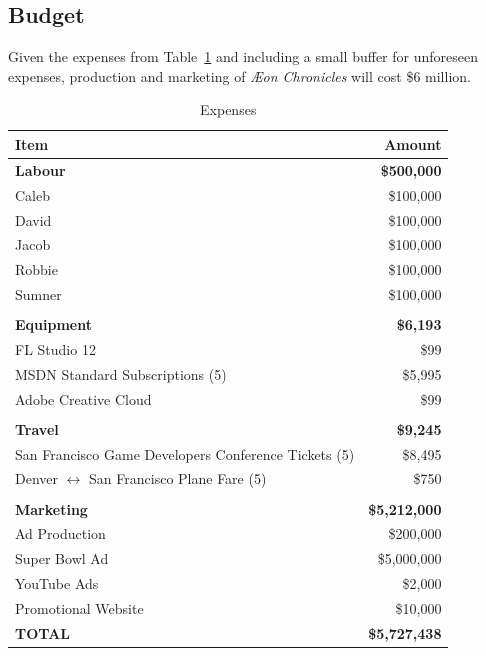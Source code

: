 \documentclass[12pt,titlepage]{article}
\newcommand\gametitle{\textit{\AE on Chronicles}\xspace}
\newcommand\tab[1][.5in]{\hspace*{#1}}
\begin{document}

\subsection{Budget}

Given the expenses from Table~\ref{tab:expenses} and including a small buffer
for unforeseen expenses, production and marketing of \gametitle will cost \$6
million.

\begin{table}[H]
    \caption{Expenses}
    \label{tab:expenses}
    \centering
    \begin{tabular}{|l|r|}
        \hline
        \textbf{Item} & Amount \\
        \hline\hline
        \textbf{Labour} & \textbf{\$500,000} \\
        \tab Caleb & \$100,000 \\
        \tab David & \$100,000 \\
        \tab Jacob & \$100,000 \\
        \tab Robbie & \$100,000 \\
        \tab Sumner & \$100,000 \\
                    &\\
        \textbf{Equipment} & \textbf{\$6,193} \\
        \tab FL Studio 12 & \$99 \\
        \tab MSDN Standard Subscriptions (5) & \$5,995 \\
        \tab Adobe Creative Cloud & \$99 \\
                                  & \\
        \textbf{Travel} & \textbf{\$9,245} \\
        \tab San Francisco Game Developers Conference Tickets (5) & \$8,495 \\
        \tab Denver $\leftrightarrow$ San Francisco Plane Fare (5) & \$750 \\
                                                                   & \\
        \textbf{Marketing} & \textbf{\$5,212,000} \\
        \tab Ad Production & \$200,000 \\
        \tab Super Bowl Ad & \$5,000,000 \\
        \tab YouTube Ads & \$2,000 \\
        \tab Promotional Website & \$10,000 \\
        \hline\hline
        \textbf{TOTAL} & \textbf{\$5,727,438} \\
        \hline
    \end{tabular}
\end{table}
\end{document}
